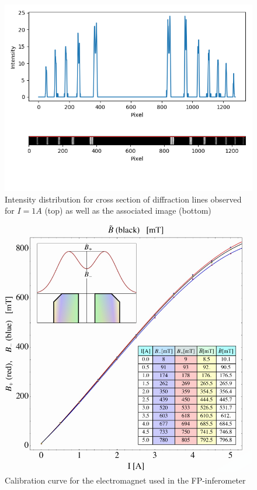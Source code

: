 \documentclass[11pt,a4paper]{article}
\begin{document}
      \begin{figure}[H]
        \center
        \includegraphics[scale=0.8]{scripts/zeeman_1a_intensity.png}
        \caption{Intensity distribution for cross section of diffraction lines observed for $I=1A$ (top) as well as the associated image (bottom)}
        \label{fig:1A_intensity_dist}
      \end{figure}

      \begin{figure}[H]
        \center
        \includegraphics[width=15cm]{scripts/figs/B_calibration_curve.png}
        \caption{Calibration curve for the electromagnet used in the FP-inferometer}
        \label{fig:cali_curve}
      \end{figure}
\end{document}
